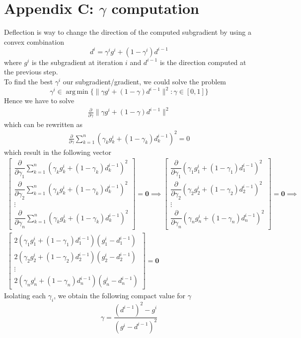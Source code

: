 \documentclass[notitlepage]{article}
\DeclareMathOperator*{\argmin}{arg\,min}
\begin{document}
\section{Appendix C: \texorpdfstring{$\gamma$}{TEXT} computation}
\label{sec:appendix_C}
Deflection is way to change the direction of the computed subgradient by using a convex combination
\[
  d^i = \gamma^i g^i + (1 - \gamma^i) d^{i-1}   
\]
where $g^i$ is the subgradient at iteration $i$ and $d^{i-1}$ is the direction computed at the previous step.\\
To find the best $\gamma^i$ our subgradient/gradient, we could solve the problem 
\[
  \gamma^i \in \argmin{ \{ \| \gamma g^i + (1 - \gamma) d^{i-1} \|^2 : \gamma \in \left[0,1\right] \} }   
\]
Hence we have to solve
\begin{align*}
  \frac{\partial}{\partial \gamma} \| \gamma g^i + (1 - \gamma) d^{i-1} \|^2
\end{align*}
which can be rewritten as
\begin{align*}
  \frac{\partial}{\partial \gamma} \sum_{k=1}^n (\gamma_k g_k^i + (1 - \gamma_k) d_k^{i-1})^2 = 0
\end{align*}
which result in the following vector
\begin{gather*}
  \begin{bmatrix}
    \dfrac{\partial}{\partial \gamma_1} \sum_{k=1}^n (\gamma_k g_k^i + (1 - \gamma_k) d_k^{i-1})^2 \\[3ex]
    \dfrac{\partial}{\partial \gamma_2} \sum_{k=1}^n (\gamma_k g_k^i + (1 - \gamma_k) d_k^{i-1})^2 \\[3ex]
    \vdots \\[3ex]
    \dfrac{\partial}{\partial \gamma_n} \sum_{k=1}^n (\gamma_k g_k^i + (1 - \gamma_k) d_k^{i-1})^2
  \end{bmatrix}
  = \boldsymbol{0} \boldsymbol{\implies} 
  \begin{bmatrix}
    \dfrac{\partial}{\partial \gamma_1} (\gamma_1 g_1^i + (1 - \gamma_1) d_1^{i-1})^2 \\[3ex]
    \dfrac{\partial}{\partial \gamma_2} (\gamma_2 g_2^i + (1 - \gamma_2) d_2^{i-1})^2 \\[3ex]
    \vdots \\[3ex]
    \dfrac{\partial}{\partial \gamma_n} (\gamma_n g_n^i + (1 - \gamma_n) d_n^{i-1})^2
  \end{bmatrix}
  = \boldsymbol{0} \boldsymbol{\implies} \\[2ex]
  \begin{bmatrix}
    2 (\gamma_1 g_1^i + (1 - \gamma_1) d_1^{i-1}) (g_1^i - d_1^{i-1}) \\[3ex]
    2 (\gamma_2 g_2^i + (1 - \gamma_2) d_2^{i-1}) (g_2^i - d_2^{i-1}) \\[3ex]
    \vdots \\[3ex]
    2 (\gamma_n g_n^i + (1 - \gamma_n) d_n^{i-1}) (g_n^i - d_n^{i-1})
  \end{bmatrix}
  = \boldsymbol{0}
\end{gather*}
Isolating each $\gamma_i$, we obtain the following compact value for $\gamma$
\[
  \gamma = \dfrac{ (d^{i-1})^2 - g^i }{ (g^i - d^{i-1})^2 }  
\]
\end{document}
